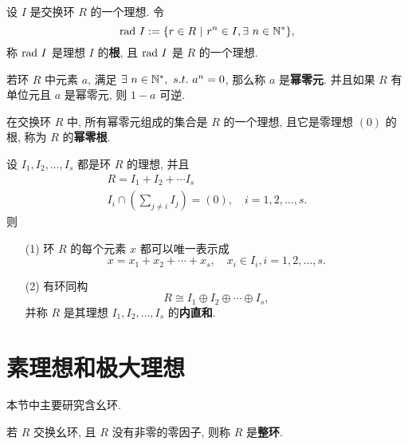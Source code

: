\begin{definition}\label{理想的根}
	设 $I$ 是交换环 $R$ 的一个理想. 令 $$\text {rad}\  I:=\{r\in R\ |\ r^n\in I,\exists\ n\in \mathbb N^*\},$$
	称 $\text {rad}\  I$ 是理想 $I$ 的\textbf{根}, 且 $\text {rad}\  I$ 是 $R$ 的一个理想.
\end{definition}

\begin{definition}\label{幂零元}
	若环 $R$ 中元素 $a$, 满足 $\exists\ n\in \N^*,\ s.t.\ a^n=0$, 那么称 $a$ 是\textbf{幂零元}.
	并且如果 $R$ 有单位元且 $a$ 是幂零元,  则 $1-a$ 可逆.
\end{definition}

\begin{definition}\label{幂零根}
	在交换环 $R$ 中, 所有幂零元组成的集合是 $R$ 的一个理想, 且它是零理想 $(0)$ 的根, 称为 $R$ 的\textbf{幂零根}.
\end{definition}

\begin{definition}\label{理想的内直和}
	设 $I_1,I_2,\ldots,I_s$ 都是环 $R$ 的理想, 并且
	\begin{equation*}
		\begin{array}{cc}
			R=I_1+I_2+\cdots I_s \\
			I_i\cap\left(\sum\limits_{j\neq i}I_j\right)=(0),\quad i=1,2,\ldots,s.
		\end{array}
	\end{equation*}
	则
	\begin{itemize}
		\item[(1)] 环 $R$ 的每个元素 $x$ 都可以唯一表示成 $$x=x_1+x_2+\cdots+x_s,\quad x_i\in I_i,i=1,2,\ldots,s.$$
		\item[(2)] 有环同构 $$R\cong I_1\oplus I_2\oplus\cdots\oplus I_s,$$ 并称 $R$ 是其理想 $I_1,I_2,\ldots,I_s$ 的\textbf{内直和}.
	\end{itemize}
\end{definition}

\section{素理想和极大理想}

\begin{remark}
	本节中主要研究含幺环.
\end{remark}

\begin{definition}\label{整环}
	若 $R$ 交换幺环, 且 $R$ 没有非零的零因子, 则称 $R$ 是\textbf{整环}.
\end{definition}

